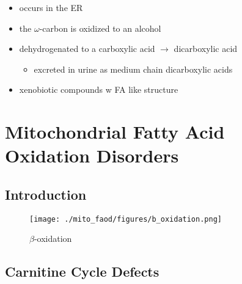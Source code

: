 \documentclass{scrartcl}
\begin{document}
\begin{itemize}
\item occurs in the ER
\item the \(\omega\)-carbon is oxidized to an alcohol
\item dehydrogenated to a carboxylic acid \(\to\) dicarboxylic acid
\begin{itemize}
\item excreted in urine as medium chain dicarboxylic acids
\end{itemize}
\item xenobiotic compounds w FA like structure
\end{itemize}
\section{Mitochondrial Fatty Acid Oxidation Disorders}
\label{sec:org2a78d21}
\subsection{Introduction}
\label{sec:org2ae4b52}
\begin{figure}[htbp]
\centering
\texttt{[image: ./mito\_faod/figures/b\_oxidation.png]}
\caption{\label{fig:org055c786}
\(\beta\)-oxidation}
\end{figure}

\subsection{Carnitine Cycle Defects}
\label{sec:org9f47e9c}
\end{document}
